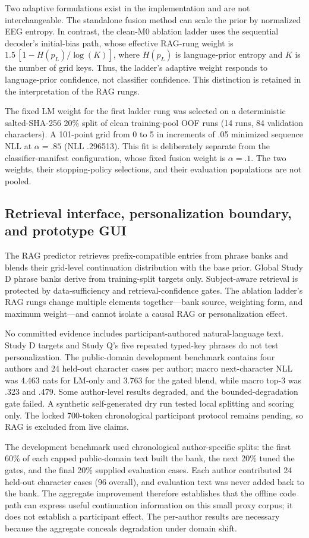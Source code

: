 \documentclass[final,5p,times,twocolumn,authoryear]{elsarticle}
\begin{document}
Two adaptive formulations exist in the implementation and are not interchangeable. The standalone fusion method can scale the prior by normalized EEG entropy. In contrast, the clean-M0 ablation ladder uses the sequential decoder's initial-bias path, whose effective RAG-rung weight is $1.5\,[1-H(p_L)/\log(K)]$, where $H(p_L)$ is language-prior entropy and $K$ is the number of grid keys. Thus, the ladder's adaptive weight responds to language-prior confidence, not classifier confidence. This distinction is retained in the interpretation of the RAG rungs.

The fixed LM weight for the first ladder rung was selected on a deterministic salted-SHA-256 20\% split of clean training-pool OOF runs (14 runs, 84 validation characters). A 101-point grid from 0 to 5 in increments of .05 minimized sequence NLL at $\alpha=.85$ (NLL .296513). This fit is deliberately separate from the classifier-manifest configuration, whose fixed fusion weight is $\alpha=.1$. The two weights, their stopping-policy selections, and their evaluation populations are not pooled.

\subsection{Retrieval interface, personalization boundary, and prototype GUI}
The RAG predictor retrieves prefix-compatible entries from phrase banks and blends their grid-level continuation distribution with the base prior. Global Study D phrase banks derive from training-split targets only. Subject-aware retrieval is protected by data-sufficiency and retrieval-confidence gates. The ablation ladder's RAG rungs change multiple elements together---bank source, weighting form, and maximum weight---and cannot isolate a causal RAG or personalization effect.

No committed evidence includes participant-authored natural-language text. Study D targets and Study Q's five repeated typed-key phrases do not test personalization. The public-domain development benchmark contains four authors and 24 held-out character cases per author; macro next-character NLL was 4.463 nats for LM-only and 3.763 for the gated blend, while macro top-3 was .323 and .479. Some author-level results degraded, and the bounded-degradation gate failed. A synthetic self-generated dry run tested local splitting and scoring only. The locked 700-token chronological participant protocol remains pending, so RAG is excluded from live claims.

The development benchmark used chronological author-specific splits: the first 60\% of each capped public-domain text built the bank, the next 20\% tuned the gates, and the final 20\% supplied evaluation cases. Each author contributed 24 held-out character cases (96 overall), and evaluation text was never added back to the bank. The aggregate improvement therefore establishes that the offline code path can express useful continuation information on this small proxy corpus; it does not establish a participant effect. The per-author results are necessary because the aggregate conceals degradation under domain shift.
\end{document}
